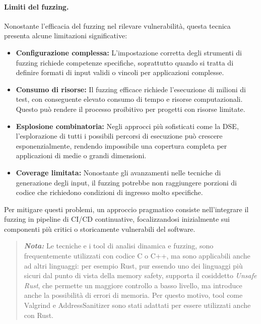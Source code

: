 \paragraph{Limiti del fuzzing.}
Nonostante l'efficacia del fuzzing nel rilevare vulnerabilità, questa tecnica
presenta alcune limitazioni significative:

\begin{itemize}
  \item \textbf{Configurazione complessa:} L'impostazione corretta degli
    strumenti di fuzzing richiede competenze specifiche, soprattutto quando si tratta
    di definire formati di input validi o vincoli per applicazioni complesse.

  \item \textbf{Consumo di risorse:} Il fuzzing efficace richiede l'esecuzione
    di milioni di test, con conseguente elevato consumo di tempo e risorse computazionali.
    Questo può rendere il processo proibitivo per progetti con risorse limitate.

  \item \textbf{Esplosione combinatoria:} Negli approcci più sofisticati come la
    DSE, l'esplorazione di tutti i possibili percorsi di esecuzione può crescere
    esponenzialmente, rendendo impossibile una copertura completa per
    applicazioni di medie o grandi dimensioni.

  \item \textbf{Coverage limitata:} Nonostante gli avanzamenti nelle tecniche di
    generazione degli input, il fuzzing potrebbe non raggiungere porzioni di codice
    che richiedono condizioni di ingresso molto specifiche.
\end{itemize}

Per mitigare questi problemi, un approccio pragmatico consiste nell'integrare il
fuzzing in pipeline di CI/CD continuative, focalizzandosi inizialmente sui componenti
più critici o storicamente vulnerabili del software.

\noindent

\begin{quote}
  \textbf{\textit{Nota:}} Le tecniche e i tool di analisi dinamica e fuzzing, sono
  frequentemente utilizzati con codice C o C++, ma sono applicabili anche ad
  altri linguaggi: per esempio Rust, pur essendo uno dei linguaggi più sicuri
  dal punto di vista della memory safety, supporta il cosiddetto \textit{Unsafe
  Rust}\footnotemark, che permette un maggiore controllo a basso livello, ma introduce
  anche la possibilità di errori di memoria. Per questo motivo, tool come Valgrind
  e AddressSanitizer sono stati adattati per essere utilizzati anche con Rust.~\cite{valgrind_rust}~\cite{rust_manual_san}
\end{quote}

